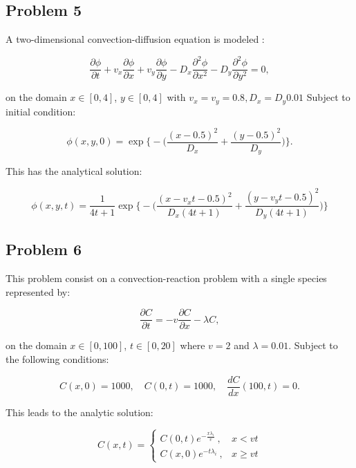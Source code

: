 \clearpage

\subsection{Problem 5}
A two-dimensional convection-diffusion equation is modeled \cite{noye1989}:

\begin{equation}
    \frac{\partial \phi }{\partial t} + v_{x}\frac{\partial \phi}{\partial x} + v_{y}\frac{\partial \phi }{\partial y} - D_{x}\frac{\partial^{2}\phi }{\partial x^{2}} - D_{y}\frac{\partial^{2}\phi}{\partial y^{2}} = 0,
\end{equation}

\noindent on the domain $x \in [0, 4]$, $y \in [0, 4]$ with $v_{x} = v_{y} = 0.8, D_{x} = D_{y} 0.01$ Subject to initial condition:

\begin{equation}
    \phi(x, y, 0) = \exp\bigg\{ -\bigg( \frac{(x - 0.5)^{2}}{D_{x}} + \frac{(y-0.5)^{2}}{D_{y}} \bigg)\bigg\}. 
\end{equation}

\noindent This has the analytical solution:

\begin{equation}
    \phi(x, y, t) = \frac{1}{4t+1}\exp\bigg\{ -\bigg( \frac{(x-v_{x}t-0.5)^{2}}{D_{x}(4t+1)} + \frac{(y-v_{y}t-0.5)^{2}}{D_{y}(4t+1)}\bigg)\bigg\}
\end{equation}

\subsection{Problem 6}
This problem consist on a convection-reaction problem with a single species represented by:

\begin{equation}
    \frac{\partial C}{\partial t} = -v\frac{\partial C}{\partial x} - \lambda C,
\end{equation}

\noindent on the domain $x \in [0,100]$, $t \in [0,20]$ where $v = 2$ and $\lambda = 0.01$. Subject to the following conditions:

\begin{equation}
    C(x, 0) = 1000, \quad C(0,t) = 1000, \quad \frac{dC}{dx}(100, t) = 0.
\end{equation}

\noindent This leads to the analytic solution:

\begin{equation}
C (x,t) = \begin{cases}
  C (0, t) e^{-\frac{x \lambda _i}{v}}\ , & x < vt \\
  C (x, 0) e^{-t \lambda _i}\ , & x \ge vt
\end{cases}
\end{equation}


